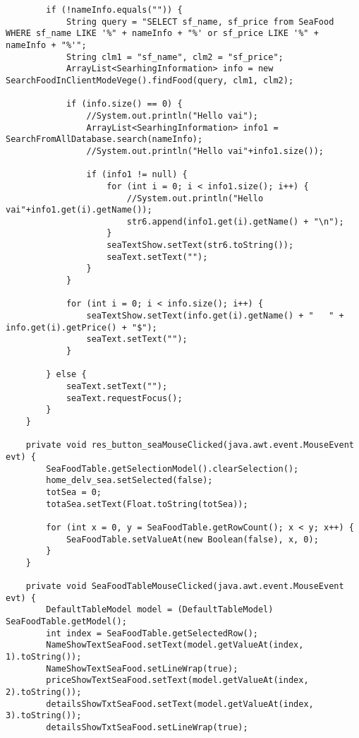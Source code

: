 \documentclass[12pt,a4paper]{article}
\begin{document}
\begin{lstlisting}
        if (!nameInfo.equals("")) {
            String query = "SELECT sf_name, sf_price from SeaFood WHERE sf_name LIKE '%" + nameInfo + "%' or sf_price LIKE '%" + nameInfo + "%'";
            String clm1 = "sf_name", clm2 = "sf_price";
            ArrayList<SearhingInformation> info = new SearchFoodInClientModeVege().findFood(query, clm1, clm2);

            if (info.size() == 0) {
                //System.out.println("Hello vai");
                ArrayList<SearhingInformation> info1 = SearchFromAllDatabase.search(nameInfo);
                //System.out.println("Hello vai"+info1.size());

                if (info1 != null) {
                    for (int i = 0; i < info1.size(); i++) {
                        //System.out.println("Hello vai"+info1.get(i).getName());
                        str6.append(info1.get(i).getName() + "\n");
                    }
                    seaTextShow.setText(str6.toString());
                    seaText.setText("");
                }
            }

            for (int i = 0; i < info.size(); i++) {
                seaTextShow.setText(info.get(i).getName() + "   " + info.get(i).getPrice() + "$");
                seaText.setText("");
            }

        } else {
            seaText.setText("");
            seaText.requestFocus();
        }
    }                                            

    private void res_button_seaMouseClicked(java.awt.event.MouseEvent evt) {                                            
        SeaFoodTable.getSelectionModel().clearSelection();
        home_delv_sea.setSelected(false);
        totSea = 0;
        totaSea.setText(Float.toString(totSea));

        for (int x = 0, y = SeaFoodTable.getRowCount(); x < y; x++) {
            SeaFoodTable.setValueAt(new Boolean(false), x, 0);
        }
    }                                           

    private void SeaFoodTableMouseClicked(java.awt.event.MouseEvent evt) {                                          
        DefaultTableModel model = (DefaultTableModel) SeaFoodTable.getModel();
        int index = SeaFoodTable.getSelectedRow();
        NameShowTextSeaFood.setText(model.getValueAt(index, 1).toString());
        NameShowTextSeaFood.setLineWrap(true);
        priceShowTextSeaFood.setText(model.getValueAt(index, 2).toString());
        detailsShowTxtSeaFood.setText(model.getValueAt(index, 3).toString());
        detailsShowTxtSeaFood.setLineWrap(true);


\end{lstlisting}
\end{document}
